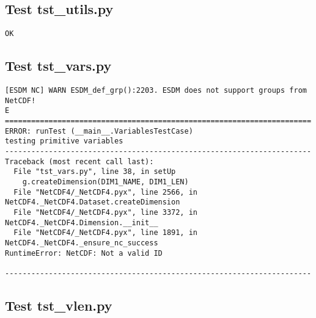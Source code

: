 \subsection{Test tst\_utils.py}

\begin{verbatim}
OK
\end{verbatim}

\subsection{Test tst\_vars.py}

\begin{verbatim}
[ESDM NC] WARN ESDM_def_grp():2203. ESDM does not support groups from NetCDF!
E
======================================================================
ERROR: runTest (__main__.VariablesTestCase)
testing primitive variables
----------------------------------------------------------------------
Traceback (most recent call last):
  File "tst_vars.py", line 38, in setUp
    g.createDimension(DIM1_NAME, DIM1_LEN)
  File "NetCDF4/_NetCDF4.pyx", line 2566, in NetCDF4._NetCDF4.Dataset.createDimension
  File "NetCDF4/_NetCDF4.pyx", line 3372, in NetCDF4._NetCDF4.Dimension.__init__
  File "NetCDF4/_NetCDF4.pyx", line 1891, in NetCDF4._NetCDF4._ensure_nc_success
RuntimeError: NetCDF: Not a valid ID

----------------------------------------------------------------------
\end{verbatim}

\subsection{Test tst\_vlen.py}

